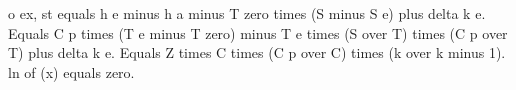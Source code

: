 o ex, st equals h e minus h a minus T zero times (S minus S e) plus delta k e. Equals C p times (T e minus T zero) minus T e times (S over T) times (C p over T) plus delta k e. Equals Z times C times (C p over C) times (k over k minus 1). ln of (x) equals zero.